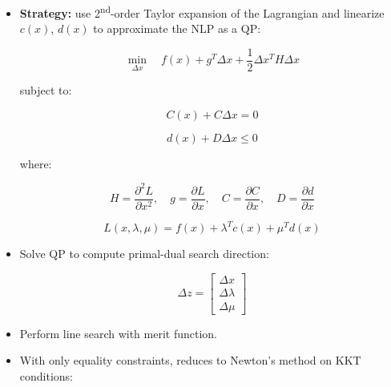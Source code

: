 \documentclass[11pt]{article}
\begin{document}
\begin{itemize}
    \item \textbf{Strategy:} use 2\textsuperscript{nd}-order Taylor expansion of the Lagrangian and linearize $c(x)$, $d(x)$ to approximate the NLP as a QP:

    \begin{equation*}
        \min_{\Delta x} \quad f(x) + g^T \Delta x + \frac{1}{2} \Delta x^T H \Delta x
    \end{equation*}
    
    subject to:
    
    \begin{equation*}
        C(x) + C \Delta x = 0
    \end{equation*}
    
    \begin{equation*}
        d(x) + D \Delta x \leq 0
    \end{equation*}
    
    where:
    
    \begin{equation*}
        H = \frac{\partial^2 L}{\partial x^2}, \quad g = \frac{\partial L}{\partial x}, \quad C = \frac{\partial C}{\partial x}, \quad D = \frac{\partial d}{\partial x}
    \end{equation*}

    \begin{equation*}
        L(x, \lambda, \mu) = f(x) + \lambda^T c(x) + \mu^T d(x)
    \end{equation*}

    \item Solve QP to compute primal-dual search direction:
    
    \begin{equation*}
        \Delta z =
        \begin{bmatrix}
            \Delta x \\
            \Delta \lambda \\
            \Delta \mu
        \end{bmatrix}
    \end{equation*}

    \item Perform line search with merit function.
    \item With only equality constraints, reduces to Newton’s method on KKT conditions:
    

\end{itemize}
\end{document}
